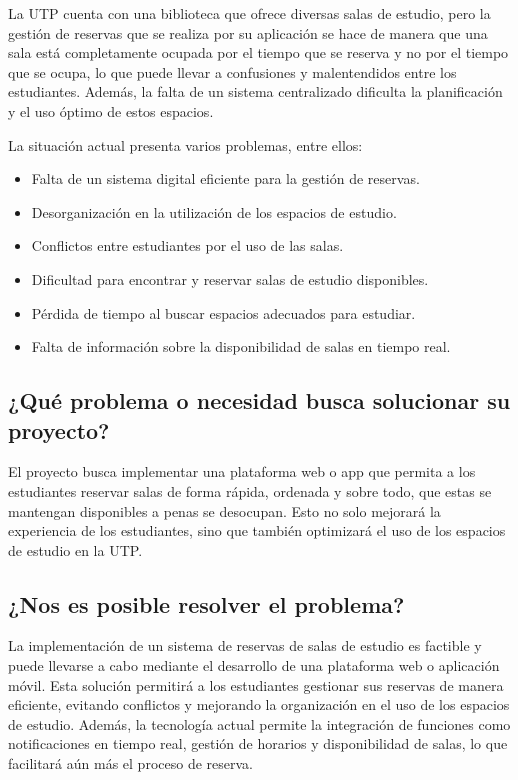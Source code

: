\documentclass{article}
\begin{document}
La UTP cuenta con una biblioteca que ofrece diversas salas de estudio, pero la gestión de reservas que se realiza por su aplicación se hace de manera que una sala está completamente ocupada por el tiempo que se reserva y no por el tiempo que se ocupa, lo que puede llevar a confusiones y malentendidos entre los estudiantes. Además, la falta de un sistema centralizado dificulta la planificación y el uso óptimo de estos espacios.

La situación actual presenta varios problemas, entre ellos:
\begin{itemize}
    \item Falta de un sistema digital eficiente para la gestión de reservas.
    \item Desorganización en la utilización de los espacios de estudio.
    \item Conflictos entre estudiantes por el uso de las salas.
    \item Dificultad para encontrar y reservar salas de estudio disponibles.
    \item Pérdida de tiempo al buscar espacios adecuados para estudiar.
    \item Falta de información sobre la disponibilidad de salas en tiempo real.
\end{itemize}

\subsection{¿Qué problema o necesidad busca solucionar su proyecto?}

El proyecto busca implementar una plataforma web o app que permita a los estudiantes 
reservar salas de forma rápida, ordenada y sobre todo, que estas se mantengan disponibles a penas se desocupan. Esto no solo mejorará la experiencia de los estudiantes, sino que también optimizará el uso de los espacios de estudio en la UTP.

\subsection{¿Nos es posible resolver el problema?}

La implementación de un sistema de reservas de salas de estudio es factible y puede llevarse a cabo mediante el desarrollo de una plataforma web o aplicación móvil. Esta solución permitirá a los estudiantes gestionar sus reservas de manera eficiente, evitando conflictos y mejorando la organización en el uso de los espacios de estudio.
Además, la tecnología actual permite la integración de funciones como notificaciones en tiempo real, gestión de horarios y disponibilidad de salas, lo que facilitará aún más el proceso de reserva.
\end{document}
